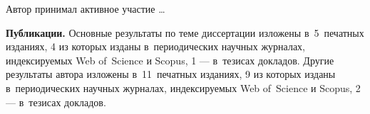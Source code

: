 {\contribution} Автор принимал активное участие \ldots

\textbf{Публикации.} Основные результаты по теме диссертации изложены в~5~печатных изданиях, 4 из которых изданы в~периодических научных журналах, индексируемых Web of~Science и Scopus, 1 --- в~тезисах докладов. Другие результаты автора изложены в~11~печатных изданиях, 9 из которых изданы в~периодических научных журналах, индексируемых Web of~Science и Scopus, 2 --- в~тезисах докладов.



